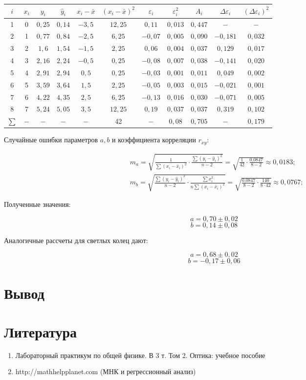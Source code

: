 \documentclass[a4paper, 12pt]{article}%
\begin{document}
\begin{tabular}{|c|c|c||c|c|c|c|c|c|c|c|}
\hline$i$ & $x_{i}$ & $y_{i}$ & $\hat{y}_{i}$ & $x_{i}-\bar{x}$ & $\left(x_{i}-\bar{x}\right)^{2}$ & $\varepsilon_{i}$ & $\varepsilon_{i}^{2}$ & $A_{i}$ & $\Delta \varepsilon_{i}$ & $\left(\Delta \varepsilon_{i}\right)^{2}$ \\
\hline 1 & 0 & $0,25$ & $0,14$ & $-3,5$ & $12,25$ & $0,11$ & $0,013$ & $0,447$ & $-$ & $-$ \\
\hline 2 & 1 & $0,77$ & $0,84$ & $-2,5$ & $6,25$ & $-0,07$ & $0,005$ & $0,090$ & $-0,181$ & $0,032$ \\
\hline 3 & 2 & $1,6$ & $1,54$ & $-1,5$ & $2,25$ & $0,06$ & $0,004$ & $0,037$ & $0,129$ & $0,017$ \\
\hline 4 & 3 & $2,16$ & $2,24$ & $-0,5$ & $0,25$ & $-0,08$ & $0,007$ & $0,038$ & $-0,141$ & $0,020$ \\
\hline 5 & 4 & $2,91$ & $2,94$ & $0,5$ & $0,25$ & $-0,03$ & $0,001$ & $0,011$ & $0,049$ & $0,002$ \\
\hline 6 & 5 & $3,59$ & $3,64$ & $1,5$ & $2,25$ & $-0,05$ & $0,003$ & $0,015$ & $-0,021$ & $0,001$ \\
\hline 7 & 6 & $4,22$ & $4,35$ & $2,5$ & $6,25$ & $-0,13$ & $0,016$ & $0,030$ & $-0,071$ & $0,005$ \\
\hline 8 & 7 & $5,24$ & $5,05$ & $3,5$ & $12,25$ & $0,19$ & $0,037$ & $0,037$ & $0,319$ & $0,102$ \\
\hline$\sum$ & $-$ & $-$ & $-$ & $-$ & 42 & $-$ & $0,08$ & $0,705$ & $-$ & $0,179$ \\
\hline
\end{tabular}


Случайные ошибки параметров $a, b$ и коэффициента корреляции $r_{x y}$:

$$
\begin{aligned}
&m_{a}=\sqrt{\frac{1}{\sum\left(x_{i}-\bar{x}_{i}\right)^{2}} \cdot \frac{\sum\left(y_{i}-\hat{y}_{i}\right)^{2}}{n-2}}=\sqrt{\frac{1}{42} \cdot \frac{0.0847}{8-2}} \approx 0,0183 ; \\
&m_{b}=\sqrt{\frac{\sum\left(y_{i}-\hat{y}_{i}\right)^{2}}{n-2} \cdot \frac{\sum x_{i}^{2}}{n \sum\left(x_{i}-\bar{x}_{i}\right)^{2}}}=\sqrt{\frac{0.0847}{8-2} \cdot \frac{140}{8 \cdot 42}} \approx 0,0767 ;
\end{aligned}
$$
	
Полученные значения:

\[ a = 0,70 \pm 0,02  \]
\[ b = 0,14 \pm 0,08  \]

Аналогичные рассчеты для светлых колец дают:

\[ a = 0,68 \pm 0,02  \]
\[ b = -0,17 \pm 0,06 \]


\section{Вывод}

 
\section{Литература}

\begin{enumerate}

\item Лабораторный практикум по общей физике. В 3 т. Том 2. Оптика: учебное пособие

\item http://mathhelpplanet.com (МНК и регрессионный анализ)

\end{enumerate}	
\end{document}
